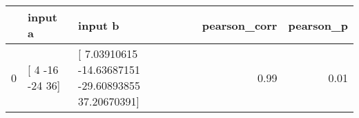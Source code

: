 \begin{tabular}{lllrr}
\toprule
 & input a & input b & pearson\_corr & pearson\_p \\
\midrule
0 & [  4 -16 -24  36] & [  7.03910615 -14.63687151 -29.60893855  37.20670391] & 0.99 & 0.01 \\
\bottomrule
\end{tabular}
